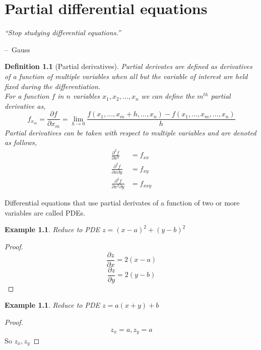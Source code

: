 \documentclass[oneside,11pt,pdftex,final]{book}%
\makeatletter
\numberwithin{equation}{section}
\newenvironment{chapquote}[2][2em]
{\setlength{\@tempdima}{#1}%
	\def\chapquote@author{#2}%
	\parshape 1 \@tempdima \dimexpr\textwidth-2\@tempdima\relax%
	\itshape}
{\par\normalfont\hfill--\ \chapquote@author\hspace*{\@tempdima}\par\bigskip}
\newtheorem{example}[theorem]{Example}
\newtheorem{definition}[theorem]{Definition}
\numberwithin{section}{chapter}
\numberwithin{equation}{chapter}
\makeatother
\begin{document}
\chapter{Partial differential equations}

\begin{chapquote}{Gauss}
	``Stop studying differential equations.''
\end{chapquote}


\begin{definition}[Partial derivatives]
	Partial derivates are defined as derivatives of a function of multiple variables when all but the variable of interest are held fixed during the differentiation.\\
	For a function $ f $ in $ n $ variables $ x_1,x_2,\dots, x_n $ we can define the $ m^{th} $ partial derivative as,
	\[ f_{x_m}=\frac{\partial f}{\partial x_m} = \lim_{h \rightarrow 0}\frac{f(x_1,\dots, x_m+h,\dots,x_n)-f(x_1,\dots,x_m, \dots,x_n)}{h}\]
	Partial derivatives can be taken with respect to multiple variables and are denoted as follows,
	\begin{align*}
		\frac{\partial^2 f}{\partial x^2}&=f_{xx}\\
		\frac{\partial^2 f}{\partial x \partial y}&=f_{xy}\\
		\frac{\partial^3 f}{\partial x^2 \partial y}&=f_{xxy}
	\end{align*}
\end{definition}
Differential equations that use partial derivates of a function of two or more variables are called PDEs.

\begin{example}
	Reduce to PDE $ z=(x-a)^2+(y-b)^2 $
\end{example}
\begin{proof}
	\[ \frac{\partial z}{\partial x} = 2(x-a)\]
	\[ \frac{\partial z}{\partial y}=2(y-b) \]
\end{proof}

\begin{example}
	Reduce to PDE $ z=a(x+y)+b $
\end{example}
\begin{proof}
	\begin{align*}
		z_x=a, z_y=a
	\end{align*}
So $ z_x,z_y $
\end{proof}
\end{document}
